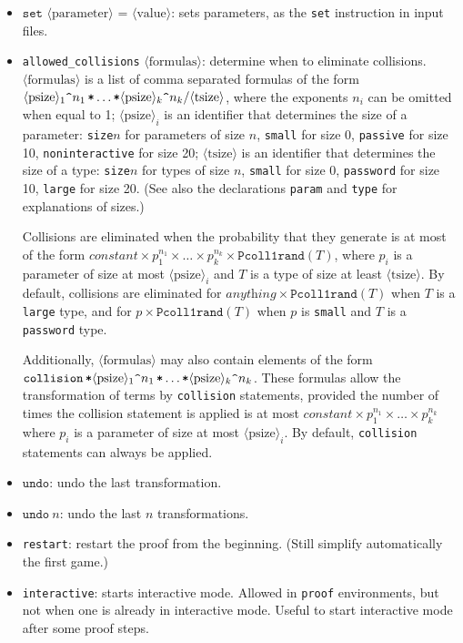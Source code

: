 \documentclass{article}
\newcommand{\tttimes}{\mathop{\texttt{*}}}
\newcommand{\nonterm}[1]{\langle\textrm{#1}\rangle}
\begin{document}
\begin{itemize}
\item $\texttt{set }\nonterm{parameter}\texttt{ = }\nonterm{value}$:
sets parameters, as the \texttt{set} instruction in input files.

\item \texttt{allowed\string_collisions} $\nonterm{formulas}$: 
determine when to eliminate collisions. $\nonterm{formulas}$ is 
a list of comma separated formulas of the form
$\nonterm{psize}_1\texttt{\string^}{n_1} \tttimes \dots \tttimes \nonterm{psize}_k\texttt{\string^}{n_k} / \nonterm{tsize}$,
where the exponents $n_i$ can be omitted when equal to 1;
$\nonterm{psize}_i$ is an identifier that determines the size of a
parameter: \texttt{size$n$} for parameters of size $n$,
\texttt{small} for size 0, \texttt{passive} for size 10,
\texttt{noninteractive} for size 20;
$\nonterm{tsize}$ is an identifier that determines the size of a type:
\texttt{size$n$} for types of size $n$,
\texttt{small} for size 0, \texttt{password} for size 10,
\texttt{large} for size 20. (See also the declarations \texttt{param}
and \texttt{type} for explanations of sizes.)

Collisions are eliminated when the probability that they generate
is at most of the form  $\textit{constant} \times p_1^{n_1} \times \dots \times p_k^{n_k} \times \texttt{Pcoll1rand}(T)$,
where $p_i$ is a parameter of size at most $\nonterm{psize}_i$
and $T$ is a type of size at least $\nonterm{tsize}$.
By default, collisions are eliminated for $\textit{anything} \times \texttt{Pcoll1rand}(T)$ when $T$ is a \texttt{large} type,
and for $p \times \texttt{Pcoll1rand}(T)$ when $p$ is \texttt{small} and $T$ is a \texttt{password} type.

Additionally, $\nonterm{formulas}$ may also contain elements of the form
$ \texttt{collision} \tttimes \nonterm{psize}_1\texttt{\string^}{n_1} \tttimes \dots \tttimes \nonterm{psize}_k\texttt{\string^}{n_k}$.
These formulas allow the transformation of terms by \texttt{collision} statements, provided 
the number of times the collision statement is applied is at most 
$\textit{constant} \times p_1^{n_1} \times \dots \times p_k^{n_k}$
where $p_i$ is a parameter of size at most $\nonterm{psize}_i$.
By default, \texttt{collision} statements can always be applied.

\item $\texttt{undo}$: undo the last transformation.

\item $\texttt{undo}\ n$: undo the last $n$ transformations.

\item \texttt{restart}: restart the proof from the beginning.
(Still simplify automatically the first game.)

\item \texttt{interactive}: starts interactive mode.
Allowed in \texttt{proof} environments, but not when one is
already in interactive mode. Useful to start interactive mode
after some proof steps.

\end{itemize}
\end{document}
